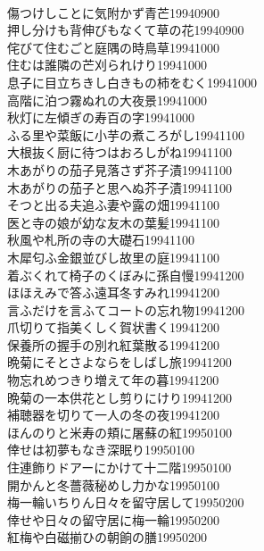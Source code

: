 \begin{multicols}{2}
\\傷つけしことに気附かず青芒\hfill{19940900}
\\押し分けも背伸びもなくて草の花\hfill{19940900}
\\侘びて住むごと庭隅の時鳥草\hfill{19941000}
\\住むは誰隣の芒刈られけり\hfill{19941000}
\\息子に目立ちきし白きもの柿をむく\hfill{19941000}
\\高階に泊つ霧ぬれの大夜景\hfill{19941000}
\\秋灯に左傾ぎの寿百の字\hfill{19941000}
\\ふる里や菜飯に小芋の煮ころがし\hfill{19941100}
\\大根抜く厨に待つはおろしがね\hfill{19941100}
\\木あがりの茄子見落さず芥子漬\hfill{19941100}
\\木あがりの茄子と思へぬ芥子漬\hfill{19941100}
\\そつと出る夫追ふ妻や露の畑\hfill{19941100}
\\医と寺の娘が幼な友木の葉髪\hfill{19941100}
\\秋風や札所の寺の大礎石\hfill{19941100}
\\木犀匂ふ金銀並びし故里の庭\hfill{19941100}
\\着ぶくれて椅子のくぼみに孫自慢\hfill{19941200}
\\ほほえみで答ふ遠耳冬すみれ\hfill{19941200}
\\言ふだけを言ふてコートの忘れ物\hfill{19941200}
\\爪切りて指美くしく賀状書く\hfill{19941200}
\\保養所の握手の別れ紅葉散る\hfill{19941200}
\\晩菊にそとさよならをしばし旅\hfill{19941200}
\\物忘れめつきり増えて年の暮\hfill{19941200}
\\晩菊の一本供花とし剪りにけり\hfill{19941200}
\\補聴器を切りて一人の冬の夜\hfill{19941200}
\\ほんのりと米寿の頬に屠蘇の紅\hfill{19950100}
\\倖せは初夢もなき深眠り\hfill{19950100}
\\住連飾りドアーにかけて十二階\hfill{19950100}
\\開かんと冬薔薇秘めし力かな\hfill{19950100}
\\梅一輪いちりん日々を留守居して\hfill{19950200}
\\倖せや日々の留守居に梅一輪\hfill{19950200}
\\紅梅や白磁揃ひの朝餉の膳\hfill{19950200}

\end{multicols}

